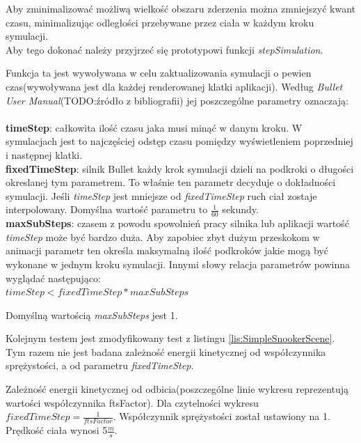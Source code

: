 Aby zminimalizować możliwą wielkość obszaru zderzenia można zmniejszyć kwant
czasu, minimalizując odległości przebywane przez ciała w każdym kroku
symulacji.\\
Aby tego dokonać należy przyjrzeć się prototypowi funkcji \emph{stepSimulation}.



Funkcja ta jest wywoływana w celu zaktualizowania symulacji o pewien
czas(wywoływana jest dla każdej renderowanej klatki aplikacji). Według
\emph{Bullet User Manual}(TODO:źródło z bibliografii) jej poszczególne parametry
oznaczają:\\
\\
\textbf{timeStep}: całkowita ilość czasu jaka musi minąć w danym kroku. W
symulacjach jest to najczęściej odstęp czasu pomiędzy wyświetleniem poprzedniej
i następnej klatki.\\
\textbf{fixedTimeStep}: silnik Bullet każdy krok symulacji dzieli na podkroki o
długości okreslanej tym parametrem. To właśnie ten parametr decyduje o
dokładności symulacji. Jeśli \emph{timeStep} jest mniejsze od
\emph{fixedTimeStep} ruch ciał zostaje interpolowany. Domyślna wartość parametru
to $ \frac{1}{60} $ sekundy.\\
\textbf{maxSubSteps}: czasem z powodu spowolnień pracy silnika lub aplikacji
wartość \emph{timeStep} może być bardzo duża. Aby zapobiec zbyt dużym przeskokom
w animacji parametr ten określa maksymalną ilość podkroków jakie mogą być
wykonane w jednym kroku symulacji. Innymi słowy relacja parametrów powinna
wyglądać następująco:\\
$ timeStep < fixedTimeStep * maxSubSteps $

Domyślną wartością \emph{maxSubSteps} jest 1.

Kolejnym testem jest zmodyfikowany test z listingu \ref{lis:SimpleSnookerScene}.
Tym razem nie jest badana zależność energii kinetycznej od współczynnika
sprężystości, a od parametru \emph{fixedTimeStep}. 



Zależność energii kinetycznej od odbicia(poszczególne linie wykresu
reprezentują wartości współczynnika ftsFactor). Dla czytelności wykresu $
fixedTimeStep = \frac{1}{ftsFactor} $. Współczynnik sprężystości został
ustawiony na 1. Prędkość ciała wynosi 5$\frac{m}{s}$.


